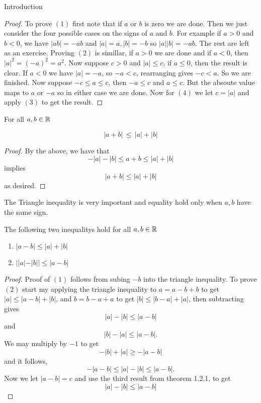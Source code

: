 \begin{chapter}{Introduction}
    
    \begin{proof}
        To prove $(1)$ first note that if $a$ or $b$ is zero we are done. Then we just consider the four possible cases on the signs of $a$ and $b$. For example if $a > 0$ and $b < 0$, 
        we have $|ab| = -ab$ and $|a| = a, |b| = -b$ so $|a||b| = -ab$. The rest are left as an exercise. 
        Proving $(2)$ is simillar, if $a > 0$ we are done and if $a < 0$, then $|a|^2 = (-a)^2 = a^2$. 
        Now suppose $c > 0$ and $|a| \leq c$, if $a \leq 0$, then the result is clear. If $a < 0$ we have $|a| = -a$, so 
        $-a < c$, rearranging gives $-c < a$. So we are finished. Now suppose $-c \leq a \leq c$, then $-a \leq c$ and $a \leq c$. But the absoute value maps to 
        $a$ or $-a$ so in either case we are done. 
        Now for $(4)$ we let $c = |a|$ and apply $(3)$ to get the result. 
    \end{proof}

    
    \begin{thm}
        For all $a, b \in \mathbb{R}$ 
        
        \begin{equation}
            |a + b| \, \leq \, |a| + |b|
        \end{equation}
    \end{thm}

    
    \begin{proof}
        By the above, we have that
        \[-|a| -|b| \leq a + b \leq |a| + |b| \] 
        implies 
        \[|a + b| \leq |a| + |b|\]
        as desired. 
    \end{proof}

    The Triangle inequality is very important and equality hold only when $a, b$ have the same sign. 

    
    
    \begin{thm}
        The following two inequalitys hold for all $a, b \in \mathbb{R}$
        
        \begin{enumerate}
            \item $|a - b| \leq |a| + |b|$
            \item $||a| -|b|| \leq |a - b|$
        \end{enumerate}
    \end{thm}

    
    \begin{proof}
        Proof of $(1)$ follows from subing $-b$ into the triangle inequality. 
        To prove $(2)$ start my applying the triangle inequality to $a = a - b + b$ to get 
        $|a| \leq |a - b| + |b| $, and $b = b - a + a$ to get $|b| \leq |b-a| + |a|$,
        then subtracting gives 
        \[|a| - |b| \leq |a - b| \] 
        and 
        \[|b| - |a| \leq |a - b|.\]
        We may multiply by $-1$ to get 
        \[-|b| + |a| \geq -|a-b|\] 
        and it follows, 
        \[-|a-b| \leq |a| - |b| \leq |a - b|.\]
        Now we let $|a - b| = c$ and use the third result from theorem 1.2.1, to get 
        \[|a|- |b| \leq |a - b|\]


\end{proof}
\end{chapter}
